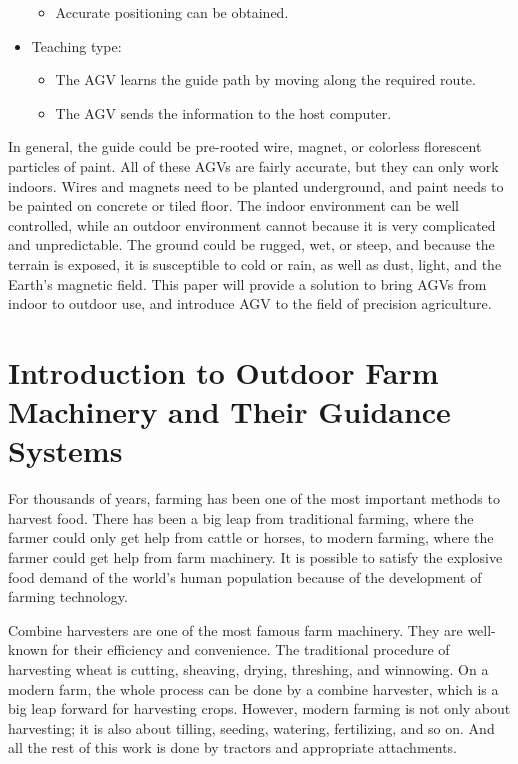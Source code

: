 \documentclass[letterpaper,12pt,oneside]{book}
\begin{document}
\begin{itemize}
\begin{itemize}
				\item Accurate positioning can be obtained.
			\end{itemize}
			\item Teaching type:
			\begin{itemize}
				\item The AGV learns the guide path by moving along the required route.
				\item The AGV sends the information to the host computer.
			\end{itemize}
		\end{itemize}
		
		In general, the guide could be pre-rooted wire, magnet, or colorless florescent particles of paint. All of these AGVs are fairly accurate, but they can only work indoors. Wires and magnets need to be planted underground, and paint needs to be painted on concrete or tiled floor. The indoor environment can be well controlled, while an outdoor environment cannot because it is very complicated and unpredictable. The ground could be rugged, wet, or steep, and because the terrain is exposed, it is susceptible to cold or rain, as well as dust, light, and the Earth's magnetic field. This paper will provide a solution to bring AGVs from indoor to outdoor use, and introduce AGV to the field of precision agriculture.
		
		\section{Introduction to Outdoor Farm Machinery and Their Guidance Systems}
		
		For thousands of years, farming has been one of the most important methods to harvest food. There has been a big leap from traditional farming, where the farmer could only get help from cattle or horses, to modern farming, where the farmer could get help from farm machinery. It is possible to satisfy the explosive food demand of the world's human population because of the development of farming technology.
		
		Combine harvesters are one of the most famous farm machinery. They are well-known for their efficiency and convenience. The traditional procedure of harvesting wheat is cutting, sheaving, drying, threshing, and winnowing. On a modern farm, the whole process can be done by a combine harvester, which is a big leap forward for harvesting crops. However, modern farming is not only about harvesting; it is also about tilling, seeding, watering, fertilizing, and so on. And all the rest of this work is done by tractors and appropriate attachments. 
		
\end{document}
